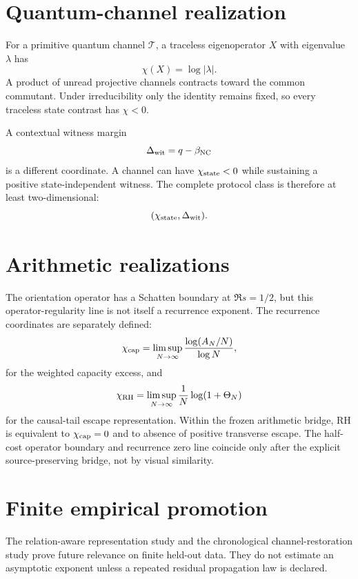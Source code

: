 \documentclass[11pt,a4paper]{article}
\begin{document}
\section{Quantum-channel realization}
For a primitive quantum channel $\mathcal T$, a traceless eigenoperator $X$ with eigenvalue $\lambda$ has
\begin{equation}
\chi(X)=\log|\lambda|.
\end{equation}
A product of unread projective channels contracts toward the common commutant. Under irreducibility only the identity remains fixed, so every traceless state contrast has $\chi<0$.

A contextual witness margin
\begin{equation}
\Delta_{\rm wit}=q-\beta_{\rm NC}
\end{equation}
is a different coordinate. A channel can have $\chi_{\rm state}<0$ while sustaining a positive state-independent witness. The complete protocol class is therefore at least two-dimensional:
\begin{equation}
(\chi_{\rm state},\Delta_{\rm wit}).
\end{equation}

\section{Arithmetic realizations}
The orientation operator has a Schatten boundary at $\Re s=1/2$, but this operator-regularity line is not itself a recurrence exponent. The recurrence coordinates are separately defined:
\begin{equation}
\chi_{\rm cap}=\limsup_{N\to\infty}\frac{\log(A_N/N)}{\log N},
\end{equation}
for the weighted capacity excess, and
\begin{equation}
\chi_{\rm RH}=\limsup_{N\to\infty}\frac1N\log(1+\Theta_N)
\end{equation}
for the causal-tail escape representation. Within the frozen arithmetic bridge, RH is equivalent to $\chi_{\rm cap}=0$ and to absence of positive transverse escape. The half-cost operator boundary and recurrence zero line coincide only after the explicit source-preserving bridge, not by visual similarity.

\section{Finite empirical promotion}
The relation-aware representation study and the chronological channel-restoration study prove future relevance on finite held-out data. They do not estimate an asymptotic exponent unless a repeated residual propagation law is declared.
\end{document}
